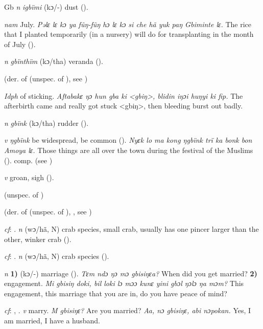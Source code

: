 \begin{letter}{Gb}
 \textit{n} \textit{igbïmi} (kɔ/-) dust (\citealt{Pichl1967}).

 \textit{nam} July. \textit{Pəlɛ lɛ kɔ ya fũŋ-fũŋ hɔ lɛ kɔ si che hã yuk paŋ Gbiminte lɛ.} The rice that I planted temporarily (in a nursery) will do for transplanting in the month of July (\citealt{Pichl1967}).

 \textit{n} \textit{gbïnthïm} (kɔ/tha) veranda (\citealt{Pichl1967}). 

 (der. of  (unspec. of ), see ) 

 \textit{Idph} of sticking. \textit{Aftabakɛ ŋɔ hun gba ki <gbiŋ>, blidin iŋɔi huŋyi ki fip.} The afterbirth came and really got stuck <gbiŋ>, then bleeding burst out badly.

 \textit{n} \textit{gbïnk} (kɔ/tha) rudder (\citealt{Pichl1967}).

 \textit{v} \textit{ŋgbïnk} be widespread, be common (\citealt{Pichl1967}). \textit{Nyɛk lo ma kong ŋgbïnk trï ka bonk bon Amoya lɛ.} Those things are all over the town during the festival of the Muslims (\citealt{Pichl1967}). comp.  (see ) 

 \textit{v} groan, sigh (\citealt{Pichl1967}). 

 (unspec. of )

 (der. of  (unspec. of ), , see ) 

 \textit{cf}: . \textit{n} (wɔ/hã, N) crab species, small crab, usually has one pincer larger than the other, winker crab (\citealt{Pichl1967}).

 \textit{cf}: . \textit{n} (wɔ/hã, N) crab species (\citealt{Pichl1967}). 

 \textit{n} \textbf{1)} (kɔ/-) marriage (\citealt{Pichl1967}). \textit{Tɛm ndɔ ŋɔ mɔ gbisiŋɛa?} When did you get married? \textbf{2)} engagement. \textit{Mi gbisiŋ doki, bil loki lɔ mɔɔ kunɛ yini gbɔl ŋɔlɔ ŋa mɔm?} This engagement, this marriage that you are in, do you have peace of mind?

 \textit{cf}: , . \textit{v} marry. \textit{M gbisiŋɛ?} Are you married? \textit{Aa, nɔ gbisiŋɛ, abi nɔpokan.} Yes, I am married, I have a husband.


\end{letter}
